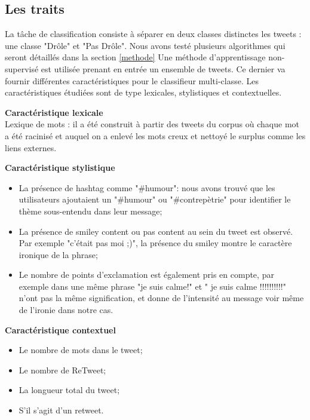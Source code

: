 \documentclass[10pt,a4paper,twoside]{article}
\begin{document}
\subsection{Les traits}
\label{features}
La tâche de classification consiste à séparer en deux classes distinctes les tweets : une classe "Drôle" et "Pas Drôle". Nous avons testé plusieurs algorithmes qui seront détaillés dans la section \ref{methode}
Une méthode d'apprentissage non-supervisé est utilisée prenant en entrée un ensemble de tweets. Ce dernier va fournir différentes caractéristiques pour le classifieur multi-classe. Les caractéristiques étudiées sont de type lexicales, stylistiques et contextuelles. 

\textbf{Caractéristique lexicale}\\
Lexique de mots : il a été construit à partir des tweets du corpus où chaque mot a été racinisé et auquel on a enlevé les mots creux et nettoyé le surplus comme les liens externes.
\vspace{0.5cm}

\textbf{Caractéristique stylistique}
\begin{itemize}
\item La présence de hashtag comme "\#humour": nous avons trouvé que les utilisateurs ajoutaient un "\#humour" ou "\#contrepètrie" pour identifier le thème sous-entendu dans leur message;
\item La présence de smiley content ou pas content au sein du tweet est observé. Par exemple "c'était pas moi ;)", la présence du smiley montre le caractère ironique de la phrase;
\item Le nombre de points d'exclamation est également pris en compte, par exemple dans une même phrase "je suis calme!" et " je suis calme !!!!!!!!!!" n'ont pas la même signification, et donne de l'intensité au message voir même de l'ironie dans notre cas. 
\end{itemize}
\vspace{0.5cm}

\textbf{Caractéristique contextuel}
\begin{itemize}
\item Le nombre de mots dans le tweet;
\item Le nombre de ReTweet;
\item La longueur total du tweet;
\item S'il s'agit d'un retweet.
\end{itemize}
\vspace{0.5cm}
\end{document}
